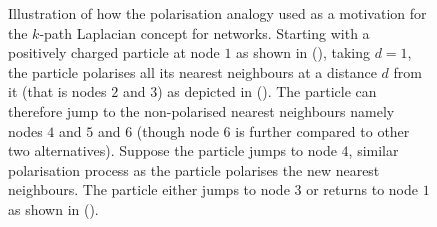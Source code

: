 \documentclass[10pt,a4paper]{article}
\theoremstyle{plain}
\theoremstyle{definition}
\begin{document}
\begin{figure}[!h]
\begin{subfigure}[b]{0.3\textwidth}
    	    	\end{subfigure}
    	    	\caption{ Illustration of how the polarisation analogy used as a motivation for the $k$-path Laplacian concept for networks. Starting with a positively charged particle at node $1$ as shown in (), taking $d=1$, the particle polarises all its nearest neighbours at a distance $d$ from it (that is nodes $2$ and $3$) as depicted in (). The particle can therefore jump to the non-polarised nearest neighbours namely nodes $4$ and $5$ and $6$ (though node $6$ is further compared to other two alternatives). Suppose the particle jumps to node $4$, similar polarisation process as the particle polarises the new nearest neighbours. The particle either jumps to node $3$ or returns to node $1$ as shown in ().}
    	    	\label{1-path-particle}
    	    \end{figure}
    	    \vspace{1cm}
    	    
\end{document}
